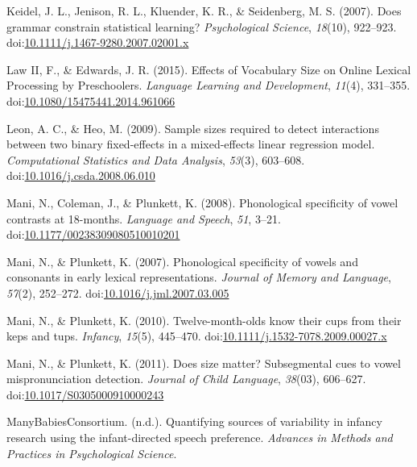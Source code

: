\documentclass[man]{apa6}
\begin{document}
\leavevmode\hypertarget{ref-Keidel2007}{}%
Keidel, J. L., Jenison, R. L., Kluender, K. R., \& Seidenberg, M. S. (2007). Does grammar constrain statistical learning? \emph{Psychological Science}, \emph{18}(10), 922--923. doi:\href{https://doi.org/10.1111/j.1467-9280.2007.02001.x}{10.1111/j.1467-9280.2007.02001.x}

\leavevmode\hypertarget{ref-Law2015}{}%
Law II, F., \& Edwards, J. R. (2015). Effects of Vocabulary Size on Online Lexical Processing by Preschoolers. \emph{Language Learning and Development}, \emph{11}(4), 331--355. doi:\href{https://doi.org/10.1080/15475441.2014.961066}{10.1080/15475441.2014.961066}

\leavevmode\hypertarget{ref-Leon2009}{}%
Leon, A. C., \& Heo, M. (2009). Sample sizes required to detect interactions between two binary fixed-effects in a mixed-effects linear regression model. \emph{Computational Statistics and Data Analysis}, \emph{53}(3), 603--608. doi:\href{https://doi.org/10.1016/j.csda.2008.06.010}{10.1016/j.csda.2008.06.010}

\leavevmode\hypertarget{ref-Mani2008}{}%
Mani, N., Coleman, J., \& Plunkett, K. (2008). Phonological specificity of vowel contrasts at 18-months. \emph{Language and Speech}, \emph{51}, 3--21. doi:\href{https://doi.org/10.1177/00238309080510010201}{10.1177/00238309080510010201}

\leavevmode\hypertarget{ref-Mani2007}{}%
Mani, N., \& Plunkett, K. (2007). Phonological specificity of vowels and consonants in early lexical representations. \emph{Journal of Memory and Language}, \emph{57}(2), 252--272. doi:\href{https://doi.org/10.1016/j.jml.2007.03.005}{10.1016/j.jml.2007.03.005}

\leavevmode\hypertarget{ref-Mani2010kepstups}{}%
Mani, N., \& Plunkett, K. (2010). Twelve-month-olds know their cups from their keps and tups. \emph{Infancy}, \emph{15}(5), 445--470. doi:\href{https://doi.org/10.1111/j.1532-7078.2009.00027.x}{10.1111/j.1532-7078.2009.00027.x}

\leavevmode\hypertarget{ref-Mani2011}{}%
Mani, N., \& Plunkett, K. (2011). Does size matter? Subsegmental cues to vowel mispronunciation detection. \emph{Journal of Child Language}, \emph{38}(03), 606--627. doi:\href{https://doi.org/10.1017/S0305000910000243}{10.1017/S0305000910000243}

\leavevmode\hypertarget{ref-MB1}{}%
ManyBabiesConsortium. (n.d.). Quantifying sources of variability in infancy research using the infant-directed speech preference. \emph{Advances in Methods and Practices in Psychological Science}.
\end{document}
